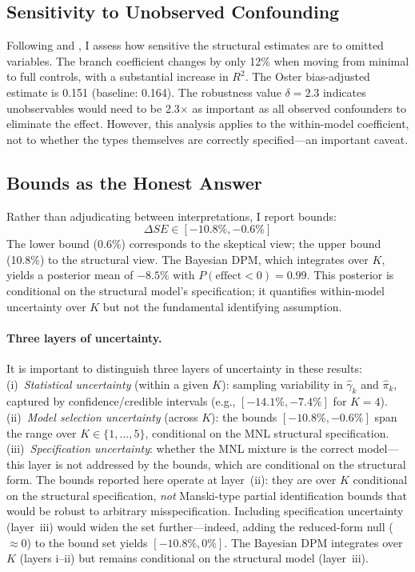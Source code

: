 \documentclass[12pt]{article}
\begin{document}
\subsection{Sensitivity to Unobserved Confounding}

Following \citet{oster2019} and \citet{cinelli2020}, I assess how sensitive the structural estimates are to omitted variables. The branch coefficient changes by only 12\% when moving from minimal to full controls, with a substantial increase in $R^2$. The Oster bias-adjusted estimate is 0.151 (baseline: 0.164). The robustness value $\delta = 2.3$ indicates unobservables would need to be 2.3$\times$ as important as all observed confounders to eliminate the effect. However, this analysis applies to the within-model coefficient, not to whether the types themselves are correctly specified---an important caveat.

\subsection{Bounds as the Honest Answer}

Rather than adjudicating between interpretations, I report bounds:
\begin{equation}
\Delta SE \in [-10.8\%, -0.6\%]
\end{equation}
The lower bound (0.6\%) corresponds to the skeptical view; the upper bound (10.8\%) to the structural view. The Bayesian DPM, which integrates over $K$, yields a posterior mean of $-8.5\%$ with $P(\text{effect} < 0) = 0.99$. This posterior is conditional on the structural model's specification; it quantifies within-model uncertainty over $K$ but not the fundamental identifying assumption.

\paragraph{Three layers of uncertainty.} It is important to distinguish three layers of uncertainty in these results: (i)~\textit{Statistical uncertainty} (within a given $K$): sampling variability in $\hat{\gamma}_k$ and $\hat{\pi}_k$, captured by confidence/credible intervals (e.g., $[-14.1\%, -7.4\%]$ for $K=4$). (ii)~\textit{Model selection uncertainty} (across $K$): the bounds $[-10.8\%, -0.6\%]$ span the range over $K \in \{1, \ldots, 5\}$, conditional on the MNL structural specification. (iii)~\textit{Specification uncertainty}: whether the MNL mixture is the correct model---this layer is not addressed by the bounds, which are conditional on the structural form. The bounds reported here operate at layer~(ii): they are over $K$ conditional on the structural specification, \textit{not} Manski-type partial identification bounds that would be robust to arbitrary misspecification. Including specification uncertainty (layer~iii) would widen the set further---indeed, adding the reduced-form null ($\approx 0$) to the bound set yields $[-10.8\%, 0\%]$. The Bayesian DPM integrates over $K$ (layers i--ii) but remains conditional on the structural model (layer~iii).
\end{document}

